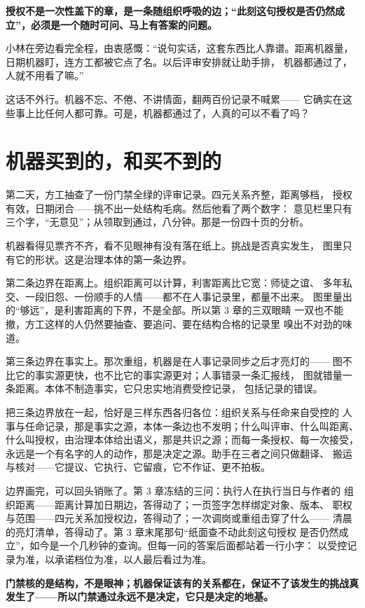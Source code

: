 \textbf{授权不是一次性盖下的章，是一条随组织呼吸的边；“此刻这句授权是否仍然成立”，必须是一个随时可问、马上有答案的问题。}

小林在旁边看完全程，由衷感慨：“说句实话，这套东西比人靠谱。距离机器量，
日期机器盯，连方工都被它点了名。以后评审安排就让助手排，
机器都通过了，人就不用看了嘛。”

这话不外行。机器不忘、不倦、不讲情面，翻两百份记录不喊累——
它确实在这些事上比任何人都可靠。可是，机器都通过了，人真的可以不看了吗？

\section{机器买到的，和买不到的}

第二天，方工抽查了一份门禁全绿的评审记录。四元关系齐整，距离够档，
授权有效，日期闭合——挑不出一处结构毛病。然后他看了两个数字：
意见栏里只有三个字，“无意见”；从领取到通过，八分钟。那是一份四十页的分析。

机器看得见票齐不齐，看不见眼神有没有落在纸上。挑战是否真实发生，
图里只有它的形状。这是治理本体的第一条边界。

第二条边界在距离上。组织距离可以计算，利害距离比它宽：师徒之谊、
多年私交、一段旧怨、一份顺手的人情——都不在人事记录里，都量不出来。
图里量出的“够远”，是利害距离的下界，不是全部。所以第 3 章的三双眼睛
一双也不能撤，方工这样的人仍然要抽查、要追问、要在结构合格的记录里
嗅出不对劲的味道。

第三条边界在事实上。那次重组，机器是在人事记录同步之后才亮灯的——
图不比它的事实源更快，也不比它的事实源更对；人事错录一条汇报线，
图就错量一条距离。本体不制造事实，它只忠实地消费受控记录，
包括记录的错误。

把三条边界放在一起，恰好是三样东西各归各位：组织关系与任命来自受控的
人事与任命记录，那是事实之源，本体一条边也不发明；什么叫评审、什么叫距离、
什么叫授权，由治理本体给出语义，那是共识之源；而每一条授权、每一次接受，
永远是一个有名字的人的动作，那是决定之源。助手在三者之间只做翻译、
搬运与核对——它提议、它执行、它留痕，它不作证、更不拍板。

边界画完，可以回头销账了。第 3 章冻结的三问：执行人在执行当日与作者的
组织距离——距离计算加日期边，答得动了；一页签字怎样绑定对象、版本、
职权与范围——四元关系加授权边，答得动了；一次调岗或重组击穿了什么——
清晨的亮灯清单，答得动了。第 3 章末尾那句“纸面查不动此刻这句授权
是否仍然成立”，如今是一个几秒钟的查询。但每一问的答案后面都站着一行小字：
以受控记录为准，以承诺档位为准，以人最后看过为准。

\textbf{门禁核的是结构，不是眼神；机器保证该有的关系都在，保证不了该发生的挑战真发生了——所以门禁通过永远不是决定，它只是决定的地基。}

